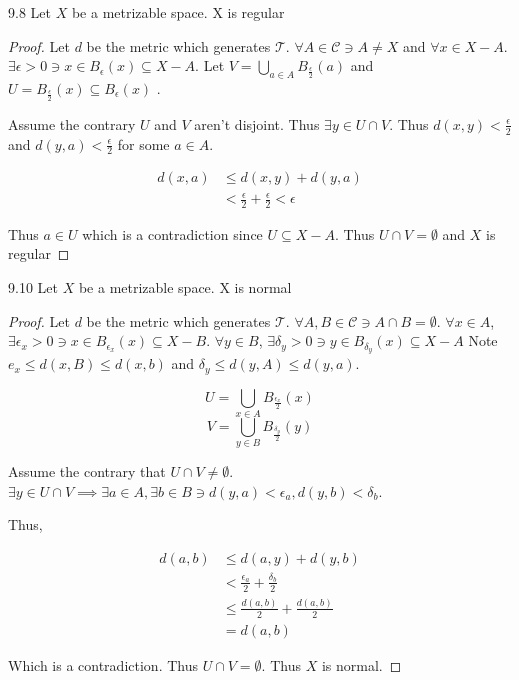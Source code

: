 \documentclass{article}
\newcommand*{\T}{\mathcal{T}}
\newcommand*{\subeq}{\subseteq}
\newcommand*{\empset}{\emptyset}
\begin{document}
\begin{claim}{9.8}\label{Claim 9.8.}
    Let $X$ be a metrizable space. X is regular  
\end{claim}
\begin{proof}
    Let $d$ be the metric which generates $\T$. $\forall A \in \mathcal{C} \ni A \neq X$ and $\forall x \in X - A$. $\exists \epsilon > 0 \ni x \in B_\epsilon(x) \subeq X - A$. Let $V = \bigcup_{a \in A}B_{\frac{\epsilon}{2}}(a)$ and $U = B_{\frac{\epsilon}{2}}(x) \subeq B_{\epsilon}(x)$ . 
    
    Assume the contrary $U$ and $V$ aren't disjoint. Thus $\exists y \in  U \cap V$. Thus $d(x, y) < \frac{\epsilon}{2}$ and $d(y, a) < \frac{\epsilon}{2}$ for some $a \in A$. 
    
    \begin{align*}
        d(x, a) &\leq d(x, y) + d(y, a)\\
        &< \frac{\epsilon}{2} + \frac{\epsilon}{2} < \epsilon
    \end{align*}

    Thus $a \in U$ which is a contradiction since $U \subeq X -A$. Thus $U \cap V = \empset$ and $X$ is regular 
\end{proof}

\bigskip

\begin{claim}{9.10}\label{Claim 9.10.}
    Let $X$ be a metrizable space. X is normal
\end{claim}
\begin{proof}
    Let $d$ be the metric which generates $\T$. $\forall A, B \in \mathcal{C} \ni A \cap B = \empset$. $\forall x \in A$, $\exists \epsilon_x > 0 \ni x \in B_{\epsilon_x}(x) \subeq X - B$. $\forall y\in B$, $\exists \delta_y > 0 \ni y \in B_{\delta_y}(x) \subeq X - A$  Note $e_x \leq d(x, B) \leq d(x, b)$ and $\delta_y \leq d(y, A) \leq d(y, a)$.
    
    
    \[U = \bigcup_{x \in A} B_{\frac{\epsilon_x}{2}}(x)\]
    \[V = \bigcup_{y \in B} B_{\frac{\delta_y}{2}}(y)\]

    Assume the contrary that $U \cap V \neq \empset$. $\exists y \in U \cap V \implies \exists a \in A, \exists b \in B \ni d(y, a) < \epsilon_a, d(y, b) < \delta_b$. 
    
    Thus, 

    \begin{align*}
        d(a, b) &\leq d(a, y) + d(y, b) \\
        &< \frac{\epsilon_a}{2} + \frac{\delta_b}{2}\\
        &\leq \frac{d(a, b)}{2} + \frac{d(a, b)}{2} \\
        &= d(a, b)
    \end{align*}

    Which is a contradiction. Thus $U \cap V = \empset$. Thus $X$ is normal.  
\end{proof}
\end{document}
